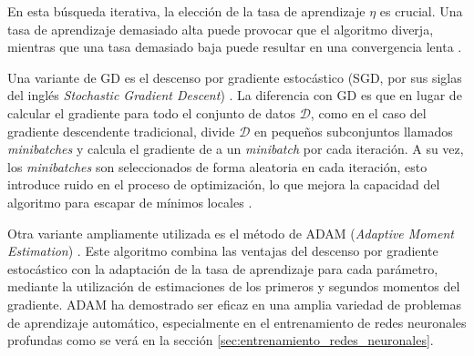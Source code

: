 En esta búsqueda iterativa, la elección de la tasa de aprendizaje $\eta$ es crucial. Una tasa de aprendizaje demasiado alta puede provocar que el algoritmo diverja, mientras que una tasa demasiado baja puede resultar en una convergencia lenta \cite{Bishop2006}.

Una variante de GD es el descenso por gradiente estocástico (SGD, por sus siglas del inglés \textit{Stochastic Gradient Descent}) \cite{RobbinsMonro1951}. La diferencia con GD es que en lugar de calcular el gradiente para todo el conjunto de datos $\mathcal{D}$, como en el caso del gradiente descendente tradicional, divide $\mathcal{D}$ en pequeños subconjuntos llamados \textit{minibatches} y calcula el gradiente de a un \textit{minibatch} por cada iteración. A su vez, los \textit{minibatches} son seleccionados de forma aleatoria en cada iteración, esto introduce ruido en el proceso de optimización, lo que mejora la capacidad del algoritmo para escapar de mínimos locales \cite{Goodfellow2016}.

Otra variante ampliamente utilizada es el método de ADAM (\textit{Adaptive Moment Estimation}) \cite{kingma2017adammethodstochasticoptimization}. Este algoritmo combina las ventajas del descenso por gradiente estocástico con la adaptación de la tasa de aprendizaje para cada parámetro, mediante la utilización de estimaciones de los primeros y segundos momentos del gradiente. ADAM ha demostrado ser eficaz en una amplia variedad de problemas de aprendizaje automático, especialmente en el entrenamiento de redes neuronales profundas \cite{Goodfellow2016} como se verá en la sección \ref{sec:entrenamiento_redes_neuronales}.
